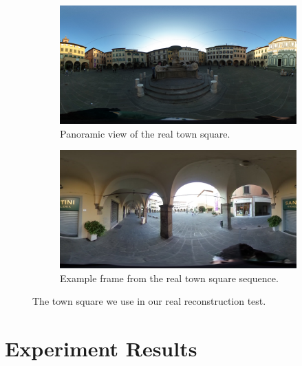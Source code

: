 \begin{figure}[h]
\centering
	\begin{subfigure}{0.7\linewidth}
		\centering
		\includegraphics[width=\linewidth]{img/piazzaLeoni.jpg}
		\caption{Panoramic view of the real town square.}
	\end{subfigure}
	\begin{subfigure}{0.7\linewidth}
		\centering
		\includegraphics[width=\linewidth]{img/piazzaLeoni_exampleds.jpg}
		\caption{Example frame from the real town square sequence.}
	\end{subfigure}
\caption{The town square we use in our real reconstruction test.}
\label{fig:piazzaLeoni}
\end{figure}

\section{Experiment Results}

